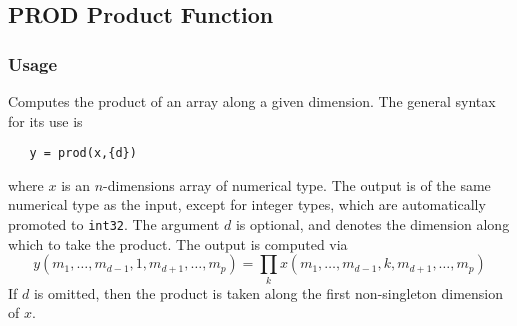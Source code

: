 %
%
%
\subsection{PROD Product Function}
\subsubsection{Usage}
Computes the product of an array along a given dimension.  The general
syntax for its use is
\begin{verbatim}
   y = prod(x,{d})
\end{verbatim}
where $x$ is an $n$-dimensions array of numerical type.
The output is of the same numerical type as the input, except 
for integer types, which are automatically promoted to \verb|int32|.
 The argument $d$ is optional, and denotes the dimension along which to take
the product.  The output is computed via
\[
  y(m_1,\ldots,m_{d-1},1,m_{d+1},\ldots,m_{p}) = 
    \prod_{k} x(m_1,\ldots,m_{d-1},k,m_{d+1},\ldots,m_{p})
\]
If $d$ is omitted, then the product is taken along the 
first non-singleton dimension of $x$. 
